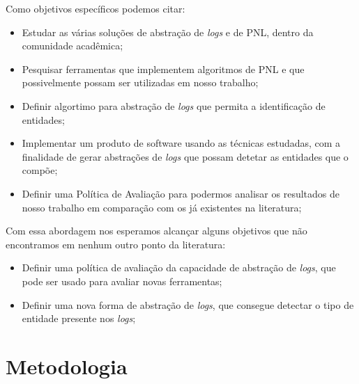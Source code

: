 \documentclass[
	12pt,				%
	openright,			%
	twoside,			%
	a4paper,			%
	english,			%
	spanish,			%
	brazil,				%
	]{abntex2}
\begin{document}
Como objetivos específicos podemos citar:
\begin{itemize}
	\item Estudar as várias soluções de abstração de \emph{logs} e de PNL, dentro da comunidade acadêmica;
	
	\item Pesquisar ferramentas que implementem algoritmos de PNL e que possivelmente possam ser utilizadas em nosso trabalho;
	
	\item Definir algortimo para abstração de \emph{logs} que permita a identificação de entidades;
	
	\item Implementar um produto de software usando as técnicas estudadas, com a finalidade de gerar abstrações de \emph{logs} que possam detetar as entidades que o compõe;
	
	\item Definir uma Política de Avaliação para podermos analisar os resultados de nosso trabalho em comparação com os já existentes na literatura;
	
\end{itemize}

Com essa abordagem nos esperamos alcançar alguns objetivos que não encontramos em nenhum outro ponto da literatura:

\begin{itemize}
	\item Definir uma política de avaliação da capacidade de abstração de \emph{logs}, que pode ser usado para avaliar novas ferramentas;
	\item Definir uma nova forma de abstração de \emph{logs}, que consegue detectar o tipo de entidade presente nos \emph{logs};
\end{itemize}

\section{Metodologia}

%
%
%
%
\end{document}
